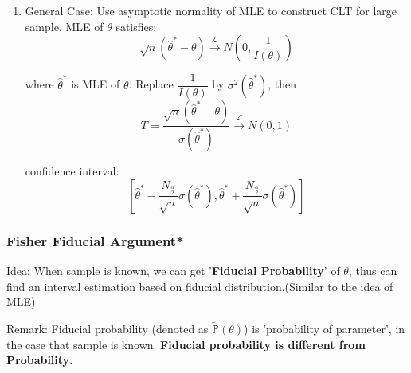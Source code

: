 \begin{enumerate}

    
    \item General Case: Use asymptotic normality of MLE to construct CLT for large sample. MLE of $\theta$ satisfies:
    \begin{equation}
        \sqrt{n}(\hat{\theta}^*-\theta)\xrightarrow[]{\mathscr{L}}N(0,\frac{1}{I(\theta)})
    \end{equation}

    where $\hat{\theta}^*$ is MLE of $\theta$. Replace $\dfrac{1}{I(\theta)}$ by $\sigma^2(\hat{\theta}^*)$, then
    \begin{equation}
        T=\frac{\sqrt{n}(\hat{\theta}^*-\theta)}{\sigma(\hat{\theta}^*)}\xrightarrow[]{\mathscr{L}}N(0,1)    
    \end{equation}

    confidence interval:
    \begin{equation}
        \left[\hat{\theta}^*-\frac{N_{\frac{\alpha}{2}}}{\sqrt{n}}\sigma(\hat{\theta}^*),\hat{\theta}^*+\frac{N_{\frac{\alpha}{2}}}{\sqrt{n}}\sigma(\hat{\theta}^*)\right]
    \end{equation}
    \end{enumerate}

\subsubsection{Fisher Fiducial Argument*}\label{SubSectionFisherFiducialArgument}
    Idea: When sample is known, we can get '\textbf{Fiducial Probability}' of $\theta$, thus can find an interval estimation based on fiducial distribution.(Similar to the idea of MLE)

    Remark: Fiducial probability (denoted as $\tilde{\mathbb{P}}(\theta)$) is 'probability of parameter', in the case that sample is known. \textbf{Fiducial probability is different from Probability}.


